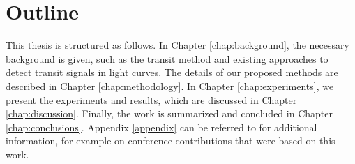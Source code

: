 
\section{Outline}
\label{sec:outline}

This thesis is structured as follows. In Chapter \ref{chap:background}, the necessary background is given, such as the transit method and existing approaches to detect transit signals in light curves. The details of our proposed methods are described in Chapter \ref{chap:methodology}. In Chapter \ref{chap:experiments}, we present the experiments and results, which are discussed in Chapter \ref{chap:discussion}. Finally, the work is summarized and concluded in Chapter \ref{chap:conclusions}. Appendix \ref{appendix} can be referred to for additional information, for example on conference contributions that were based on this work.
